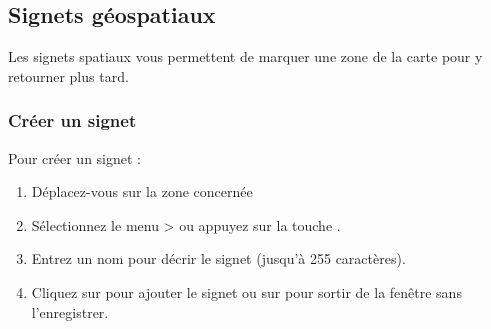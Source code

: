%
%
%

\subsection{Signets g\'eospatiaux}\label{sec:bookmarks}

Les signets spatiaux vous permettent de marquer une zone de la carte pour y retourner plus tard.

\subsubsection{Cr\'eer un signet}
Pour cr\'eer un signet :
\begin{enumerate}
\item D\'eplacez-vous sur la zone concern\'ee
\item S\'electionnez le menu  >  ou appuyez sur la touche .
\item Entrez un nom pour d\'ecrir le signet (jusqu'\`a 255 caract\`eres).
\item Cliquez sur  pour ajouter le signet ou sur  pour sortir de la fen\^etre sans l'enregistrer.
\end{enumerate}

